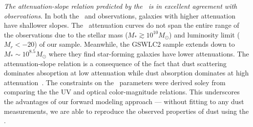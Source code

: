 \emph{The attenuation-slope relation predicted by the \eda~is in excellent 
agreement with observations}. In both the \eda~and observations, galaxies with 
higher attenuation have shallower slopes. The \eda~attenuation curves do not
span the entire range of the observations due to the stellar mass ($M_* \gtrsim 
10^{10} M_\odot$) and luminosity limit ($M_r < -20$) of our sample. Meanwhile, 
the \cite{salim2020} GSWLC2 sample extends down to $M_* \sim 10^{8.5}M_\odot$ 
where they find star-forming galaxies have lower attenuations.  The
attenuation-slope relation is a consequence of the fact that dust scattering 
dominates absoprtion at low attenuation while dust absorption dominates at high 
attenuation~\citep{gordon1994, witt2000, draine2003, chevallard2013}. The
constraints on the \eda~parameters were derived soley from comparing the the
UV and optical color-magnitude relations. This underscores the advantages of 
our forward modeling approach --- without fitting to any dust measurements, we
are able to reproduce the observed properties of dust using the \eda.


